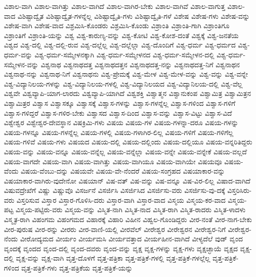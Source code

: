 {ವಿಶಾಲ-ವಾಗಿ
ವಿಶಾಲ-ವಾಗಿತ್ತು
ವಿಶಾಲ-ವಾಗಿದೆ
ವಿಶಾಲ-ವಾಗಿರ-ಬೇಕು
ವಿಶಾಲ-ವಾಗಿವೆ
ವಿಶಾಲ-ವಾಗುತ್ತ
ವಿಶಾಲ-ವಾದ
ವಿಶಿಷ್ಟಾದ್ವೈತ
ವಿಶಿಷ್ಟಾದ್ವೈತ-ಗಳನ್ನೆಲ್ಲ
ವಿಶಿಷ್ಟಾದ್ವೈತಿ-ಗಳು
ವಿಶಿಷ್ಟಾದ್ವೈತಿ-ಗಳೆ
ವಿಶೇಷ
ವಿಶೇಷ-ಗಳು
ವಿಶೇಷ-ವನ್ನು
ವಿಶೇಷ-ವಾಗಿ
ವಿಶೇಷ-ವಾದ
ವಿಶ್ರಮಿಸಿ-ಕೊಂಡರು
ವಿಶ್ರಮಿಸಿ-ಕೊಂಡು
ವಿಶ್ರಾಂತಿ
ವಿಶ್ರಾಂತಿ-ಗಾಗಿ
ವಿಶ್ರಾಂತಿಗೂ
ವಿಶ್ರಾಂತಿಗೆ
ವಿಶ್ರಾಂತಿ-ಯನ್ನು
ವಿಶ್ವ
ವಿಶ್ವ-ಕಾರುಣ್ಯ-ವನ್ನು
ವಿಶ್ವ-ಕೋಟಿ
ವಿಶ್ವ-ಕೋಶ-ದಂತೆ
ವಿಶ್ವಕ್ಕೆ
ವಿಶ್ವ-ಜನತೆಯ
ವಿಶ್ವದ
ವಿಶ್ವ-ದಲ್ಲಿ
ವಿಶ್ವ-ದಲ್ಲಿ-ರುವ
ವಿಶ್ವ-ದಲ್ಲೆಲ್ಲ
ವಿಶ್ವ-ದಲ್ಲೆಲ್ಲಾ
ವಿಶ್ವ-ದೊಂದಿಗೆ
ವಿಶ್ವ-ಧರ್ಮ
ವಿಶ್ವ-ಧರ್ಮದ
ವಿಶ್ವ-ಧರ್ಮ-ವನ್ನು
ವಿಶ್ವ-ಧರ್ಮ-ಸಮ್ಮೇಳನಕ್ಕಾಗಿ
ವಿಶ್ವ-ಧರ್ಮ-ಸಮ್ಮೇಳನದ
ವಿಶ್ವ-ಧರ್ಮ-ಸಮ್ಮೇಳನ-ದಲ್ಲಿ
ವಿಶ್ವ-ಧರ್ಮ-ಸಮ್ಮೇಳನ-ವನ್ನು
ವಿಶ್ವನಾಥ
ವಿಶ್ವನಾಥದತ್ತ
ವಿಶ್ವನಾಥದತ್ತನ
ವಿಶ್ವನಾಥದತ್ತ-ನನ್ನು
ವಿಶ್ವನಾಥದತ್ತ-ನಿಗೆ
ವಿಶ್ವನಾಥನ
ವಿಶ್ವನಾಥ-ನನ್ನು
ವಿಶ್ವನಾಥ-ನಿಗೆ
ವಿಶ್ವನಾಥನು
ವಿಶ್ವ-ಪ್ರೇಮಕ್ಕೆ
ವಿಶ್ವ-ಮೇಳ
ವಿಶ್ವ-ಮೇಳ-ವನ್ನು
ವಿಶ್ವ-ವನ್ನು
ವಿಶ್ವ-ವನ್ನೇ
ವಿಶ್ವ-ವಿದ್ಯಾನಿಲಯ-ಗಳನ್ನು
ವಿಶ್ವ-ವಿದ್ಯಾನಿಲಯ-ಗಳಲ್ಲಿ
ವಿಶ್ವ-ವಿದ್ಯಾನಿಲಯದ
ವಿಶ್ವ-ವಿದ್ಯಾನಿಲಯ-ದಲ್ಲಿ
ವಿಶ್ವ-ವೆಲ್ಲ
ವಿಶ್ವವೇ
ವಿಶ್ವವ್ಯಾಪಿ-ಯಾಗ-ಲಾರದು
ವಿಶ್ವವ್ಯಾಪಿ-ಯಾಗಿದೆ
ವಿಶ್ವಶಕ್ತಿ
ವಿಶ್ವಾತ್ಮನ
ವಿಶ್ವಾನುಕಂಪ
ವಿಶ್ವಾಮಿತ್ರ
ವಿಶ್ವಾಮಿತ್ರನ
ವಿಶ್ವಾಮಿತ್ರರ
ವಿಶ್ವಾಸ
ವಿಶ್ವಾಸಕ್ಕೂ
ವಿಶ್ವಾಸಕ್ಕೆ
ವಿಶ್ವಾಸ-ಗಳನ್ನು
ವಿಶ್ವಾಸ-ಗಳನ್ನೆಲ್ಲ
ವಿಶ್ವಾಸ-ಗಳಿಂದ
ವಿಶ್ವಾಸ-ಗಳಿಗೆ
ವಿಶ್ವಾಸ-ಗಳಿದ್ದರೆ
ವಿಶ್ವಾಸ-ಗಳಿರ-ಬೇಕು
ವಿಶ್ವಾಸದ
ವಿಶ್ವಾಸ-ದಿಂದ
ವಿಶ್ವಾಸ-ವನ್ನು
ವಿಶ್ವಾಸ-ವಿಟ್ಟು
ವಿಶ್ವಾಸ-ವಿದೆ
ವಿಶ್ವೇಶ್ವರ
ವಿಶ್ವೇಶ್ವರ-ದೇವಸ್ಥಾನ
ವಿಷಕ್ರಿಮಿ-ಗಳು
ವಿಷಯ
ವಿಷಯ-ಗಳ
ವಿಷಯ-ಗಳನ್ನಾ-ದರೂ
ವಿಷಯ-ಗಳನ್ನು
ವಿಷಯ-ಗಳನ್ನೂ
ವಿಷಯ-ಗಳನ್ನೆಲ್ಲ
ವಿಷಯ-ಗಳಲ್ಲಿ
ವಿಷಯ-ಗಳಾಗಿರ-ಲಿಲ್ಲ
ವಿಷಯ-ಗಳಿಗೆ
ವಿಷಯ-ಗಳಿಗೆಲ್ಲ
ವಿಷಯ-ಗಳಿವೆ
ವಿಷಯ-ಗಳು
ವಿಷಯದ
ವಿಷಯ-ದಲ್ಲಿ
ವಿಷಯ-ದಲ್ಲಿಂದು
ವಿಷಯ-ದಲ್ಲಿಯೂ
ವಿಷಯ-ವನ್ನರಿತಿದ್ದರು
ವಿಷಯ-ವನ್ನು
ವಿಷಯ-ವನ್ನೂ
ವಿಷಯ-ವನ್ನೆಲ್ಲ
ವಿಷಯ-ವನ್ನೆಲ್ಲಾ
ವಿಷಯ-ವನ್ನೇ
ವಿಷಯ-ವನ್ನೇಕೆ
ವಿಷಯ-ವಲ್ಲದೆ
ವಿಷಯ-ವಾಗದೇ
ವಿಷಯ-ವಾಗಿ
ವಿಷಯ-ವಾಗಿತ್ತು
ವಿಷಯ-ವಾಗಿಯೂ
ವಿಷಯ-ವಾಗಿಯೇ
ವಿಷಯವೂ
ವಿಷಯ-ವೆಂದು
ವಿಷಯ-ವೆಂಬು-ದನ್ನು
ವಿಷಯವೇ
ವಿಷಯ-ವೇ-ನೆಂದರೆ
ವಿಷಯ-ಸಂಗ್ರಹದ
ವಿಷಯಾಕಾರ-ವನ್ನು
ವಿಷಯಾಕಾರ-ವಾಗಿರು-ವುದೇನೋ
ವಿಷಯಾನ್
ವಿಷ-ವತ್
ವಿಷ-ವನ್ನು
ವಿಷ-ವನ್ನೂ
ವಿಷ-ವಿರ-ಲಿಲ್ಲ
ವಿಷಾದ-ವಾಗಿದೆ
ವಿಷುವದ್ರೇಖೆಗೆ
ವಿಷ್ಣು
ವಿಷ್ಣುವೊ
ವಿಸರ್ಜನೆ
ವಿಸರ್ಜಿಸಿ
ವಿಸರ್ಜಿಸಿದ
ವಿಸರ್ಜಿಸು-ವರು
ವಿಸರ್ಜಿಸು-ವು-ದಕ್ಕೆ
ವಿಸ್ತರಿಸಿರು-ವರು
ವಿಸ್ತರಿಸುವ
ವಿಸ್ತಾರ
ವಿಸ್ತಾರ-ಗೊಳಿಸಿ-ದರು
ವಿಸ್ತಾರ-ವಾಗಿ
ವಿಸ್ತಾರ-ವಾದ
ವಿಸ್ಮಯ
ವಿಸ್ಮಯ-ಕರ-ವಾದ
ವಿಸ್ಮಯ-ಪಟ್ಟ
ವಿಸ್ಮಯ-ಪಟ್ಟಿರು-ವರು
ವಿಸ್ಮಯ-ವನ್ನು
ವಿಸ್ಮಿತ-ನಾಗಿ
ವಿಸ್ಮಿತ-ನಾದ
ವಿಸ್ಮಿತ-ರಾಗಿ
ವಿಸ್ಮಿತ-ರಾದರು
ವಿಸ್ಮಿತ-ಳಾದಳು
ವಿಸ್ಮೃತ-ರಾಗಿ
ವಿಹಂಗಮ
ವಿಹಂಗಮದ
ವಿಹಾರಕ್ಕೆ
ವಿಹಾರಿ
ವಿಹೀನ
ವಿಹ್ವಲ-ಗೊಂಡಿದ್ದರು
ವೀರ-ನಂತೆ
ವೀರ-ನಾಗ-ಬೇಕು
ವೀರ-ಪುರುಷ
ವೀರ-ರನ್ನು
ವೀರರು
ವೀರ-ವಾಣಿ-ಯಲ್ಲಿ
ವೀರವೆಲ್
ವೀರೇಶ್ವರ
ವೀರೇಶ್ವರನ
ವೀರೇಶ್ವರ-ನಿಗೆ
ವೀರೇಶ್ವರ-ನೆಂದು
ವೀರೋದ್ಯಮದ
ವೀರ್ಯಂ
ವೀರ್ಯಮಸಿ
ವೀರ್ಯವತ್ತಾದ
ವೀರ್ಯಹೀನ-ವಾಗಿದೆ
ವೀಳ್ಯದೆಲೆ
ವುಡ್
ವೃಂದ
ವೃಂದಕ್ಕೆ
ವೃಂದದ
ವೃಂದ-ದಲ್ಲಿ
ವೃಂದ-ದವರು
ವೃಂದ-ವನ್ನು
ವೃಕ್ಷ
ವೃಕ್ಷ-ಗಳನ್ನು
ವೃಕ್ಷ-ಗಳು
ವೃಕ್ಷಚ್ಛಾಯೆ
ವೃಕ್ಷದ
ವೃಕ್ಷ-ದಲ್ಲಿ
ವೃಕ್ಷ-ವನ್ನು
ವೃಕ್ಷ-ವಾಗಿ
ವೃತ್ತ-ದೊಳಗೆ
ವೃತ್ತ-ಪತ್ರಿಕಾ
ವೃತ್ತ-ಪತ್ರಿಕೆ-ಗಳಲ್ಲಿ
ವೃತ್ತ-ಪತ್ರಿಕೆ-ಗಳಲ್ಲೆಲ್ಲ
ವೃತ್ತ-ಪತ್ರಿಕೆ-ಗಳಿಂದ
ವೃತ್ತ-ಪತ್ರಿಕೆ-ಗಳು
ವೃತ್ತ-ಪತ್ರಿಕೆಯ
ವೃತ್ತ-ಪತ್ರಿಕೆ-ಯನ್ನು
}
